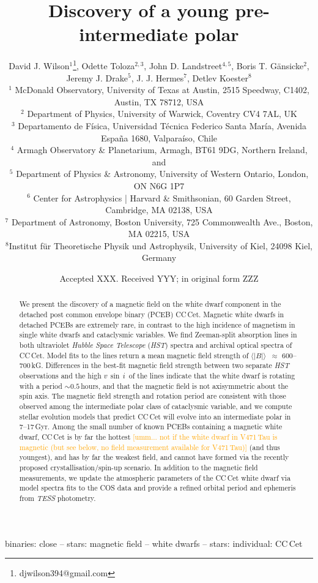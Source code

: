 \documentclass[fleqn,usenatbib]{mnras}
\title[A pre-intermediate polar]{Discovery of a young pre-intermediate polar}
\author[Wilson et al.]{David J. Wilson$^{1}$\thanks{djwilson394@gmail.com}, Odette Toloza$^{2,3}$, John D. Landstreet$^{4,5}$,
Boris T. G{\"a}nsicke$^{2}$, \newauthor Jeremy J.  Drake$^{5}$, J. J. Hermes$^{7}$, Detlev Koester$^{8}$  \medskip\\
$^{1}$ McDonald Observatory, University of Texas at Austin, 2515 Speedway, C1402, Austin, TX 78712, USA \\ 
$^{2}$ Department of Physics, University of Warwick, Coventry CV4 7AL, UK \\
$^{3}$ Departamento de Física, Universidad Técnica Federico Santa María, Avenida España 1680, Valparaíso, Chile\\
$^{4}$ Armagh Observatory \& Planetarium, Armagh, BT61 9DG, Northern Ireland, and  \\
$^{5}$ Department of Physics \& Astronomy, University of Western Ontario, London, ON N6G 1P7 \\
$^{6}$ Center for Astrophysics | Harvard \& Smithsonian, 60 Garden Street, Cambridge, MA 02138, USA\\
$^{7}$ Department of Astronomy, Boston University, 725 Commonwealth Ave., Boston, MA 02215, USA\\
$^{8}$Institut f{\"u}r Theoretische Physik und Astrophysik, University of Kiel, 24098 Kiel, Germany 
}
\date{Accepted XXX. Received YYY; in original form ZZZ}
\newcommand{\bs}{\ensuremath{\langle \vert B \vert \rangle}}
\newcommand{\vsini}{\ensuremath{v\,\sin\,i}}
\newcommand{\bgc}[1]{\textcolor{orange}{[#1]}}
\begin{document}
\label{firstpage}
\pagerange{\pageref{firstpage}--\pageref{lastpage}}
\maketitle

\begin{abstract}
We present the discovery of a magnetic field on the white dwarf component in the detached post common envelope binary (PCEB) CC\,Cet. Magnetic white dwarfs in detached PCEBs are extremely rare, in contrast to the high incidence of magnetism in single white dwarfs and cataclysmic variables. We find Zeeman-split absorption lines in both ultraviolet \textit{Hubble Space Telescope} (\textit{HST}) spectra and archival optical spectra of CC\,Cet. Model fits to the lines return a mean magnetic field strength of  \bs\ $\approx$ 600--700\,kG. Differences in the best-fit magnetic field strength between two separate \textit{HST} observations and the high \vsini\ of the lines indicate that the white dwarf is  rotating with a period $\sim0.5$\,hours, and that the magnetic field is not axisymmetric about the spin axis. The magnetic field strength and rotation period are consistent with those observed among the intermediate polar class of cataclysmic variable, and we compute stellar evolution models that predict CC\,Cet will evolve into an intermediate polar in 7--17\,Gyr. Among the small number of known PCEBs containing a magnetic white dwarf, CC\,Cet is by far the hottest \bgc{umm... not if the white dwarf in V471\,Tau is magnetic (but see below, no field measurement available for V471\,Tau)} (and thus youngest), and has by far the weakest field, and cannot have formed via the recently proposed crystallisation/spin-up scenario. In addition to the magnetic field measurements, we update the atmospheric parameters of the CC\,Cet white dwarf via model spectra fits to the COS data and provide a refined orbital period and ephemeris from \textit{TESS} photometry.       
\end{abstract}

\begin{keywords}
binaries: close -- stars: magnetic field -- white dwarfs -- stars: individual: CC\,Cet
\end{keywords}


\end{document}
